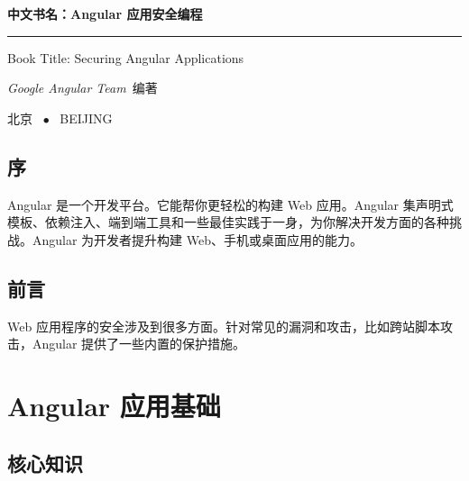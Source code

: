 \documentclass[a4paper,twoside]{ctexbook}
\begin{document}
\begin{titlepage}
  \vspace*{25ex}

  \hspace{0.05\textwidth}\begin{minipage}{.9\textwidth}
    \flushright

    {\textbf{中文书名：Angular 应用安全编程}}

    \rule{\linewidth}{.5pt}

    \vspace{2ex}

    {\textsf{Book Title: Securing Angular Applications}} \\

    \vspace{20ex}

    {\textit{Google Angular Team}~编著}
  \end{minipage}

  \vfill

  \centering
  {北京 ~$\bullet$ ~BEIJING}
\end{titlepage}
\thispagestyle{empty}


\frontmatter


\chapter{序}

Angular 是一个开发平台。它能帮你更轻松的构建 Web 应用。Angular 集声明式模板、依赖注入、端到端工具和一些最佳实践于一身，为你解决开发方面的各种挑战。Angular 为开发者提升构建 Web、手机或桌面应用的能力。

\chapter{前言}

Web 应用程序的安全涉及到很多方面。针对常见的漏洞和攻击，比如跨站脚本攻击，Angular 提供了一些内置的保护措施。

\clearpage
{
  \hypersetup{hidelinks}
  \tableofcontents
}


\mainmatter


\part{Angular 应用基础}


\chapter{核心知识}
\end{document}
